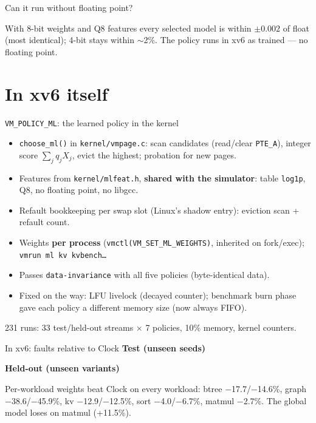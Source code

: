 \documentclass[10pt,aspectratio=169]{beamer}
\newcommand{\good}[1]{\textcolor{good}{#1}}
\newcommand{\warn}[1]{\textcolor{warn}{#1}}
\newcommand{\tbl}[1]{{\scriptsize}}
\newcommand{\wtbl}[1]{\resizebox{\textwidth}{!}{\scriptsize}}
\begin{document}
\begin{frame}{Can it run without floating point?}
  \centering\tbl{quant_compact}

  \medskip
  \small With 8-bit weights and Q8 features every selected model is
  \good{within $\pm0.002$ of float} (most identical); 4-bit stays within $\sim$2\%.
  The policy runs in xv6 as trained --- no floating point.
\end{frame}

\section{In xv6 itself}

\begin{frame}{\texttt{VM\_POLICY\_ML}: the learned policy in the kernel}
  \small
  \begin{itemize}
    \item \texttt{choose\_ml()} in \texttt{kernel/vmpage.c}: scan candidates (read/clear
      \texttt{PTE\_A}), integer score $\sum_j q_j X_j$, evict the highest; probation for new pages.
    \item Features from \texttt{kernel/mlfeat.h}, \textbf{shared with the simulator}: table
      \texttt{log1p}, Q8, no floating point, no libgcc.
    \item Refault bookkeeping per swap slot (Linux's shadow entry): eviction scan + refault count.
    \item Weights \textbf{per process} (\texttt{vmctl(VM\_SET\_ML\_WEIGHTS)}, inherited on
      fork/exec); \texttt{vmrun ml kv kvbench\ldots}
    \item Passes \texttt{data-invariance} with all five policies (byte-identical data).
    \item Fixed on the way: LFU livelock (decayed counter); benchmark burn phase gave
      each policy a different memory size (now always FIFO).
  \end{itemize}
  \medskip\small
  231 runs: 33 test/held-out streams $\times$ 7 policies, 10\% memory, kernel counters.
\end{frame}

\begin{frame}{In xv6: faults relative to Clock}
  \centering
  \textbf{\small Test (unseen seeds)}\\[2pt]\wtbl{kernel_test}

  \medskip
  \textbf{\small Held-out (unseen variants)}\\[2pt]\wtbl{kernel_heldout}

  \medskip
  \small Per-workload weights \good{beat Clock on every workload}: btree $-$17.7/$-$14.6\%,
  graph $-$38.6/$-$45.9\%, kv $-$12.9/$-$12.5\%, sort $-$4.0/$-$6.7\%, matmul $-$2.7\%. The global
  model \warn{loses on matmul} (+11.5\%).
\end{frame}
\end{document}
